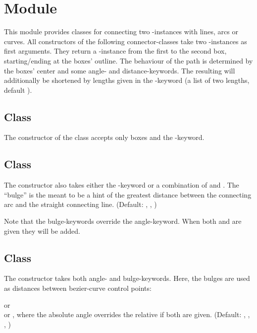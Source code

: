 \chapter{Module }
\label{connector}

This module provides classes for connecting two -instances with
lines, arcs or curves.
All constructors of the following connector-classes take two
-instances as first arguments. They return a
-instance from the first to the second box, starting/ending at
the boxes' outline. The behaviour of the path is determined by the
boxes' center and some angle- and distance-keywords. The resulting  will
additionally be shortened by lengths given in the -keyword (a
list of two lengths, default \code{[0,0]}).

\section{Class }

The constructor of the  class accepts only boxes and the
-keyword.

\section{Class }

The constructor also takes either the -keyword or a
combination of  and . The ``bulge'' is the
meant to be a hint of the greatest distance between the connecting arc and the
straight connecting line. (Default: ,
, )\medskip

Note that the bulge-keywords override the angle-keyword. When both
 and  are given they will be added.

\section{Class }

The constructor takes both angle- and bulge-keywords. Here, the bulges are
used as distances between bezier-curve control points:\medskip

 or \\
 or , where the absolute angle overrides the
relative if both are given. (Default: ,
, , )\medskip

